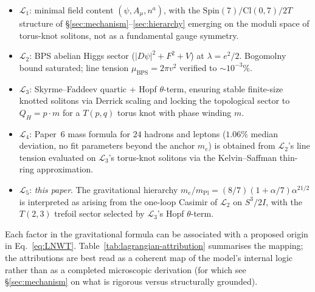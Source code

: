 \documentclass[11pt]{article}
\begin{document}
\begin{itemize}
  \item $\mathcal{L}_1$: minimal field content $(\psi, A_\mu,
        n^a)$, with the $\mathrm{Spin}(7)/\mathrm{Cl}(0,7)/2T$
        structure of \S\ref{sec:mechanism}--\ref{sec:hierarchy}
        emerging on the moduli space of torus-knot solitons,
        not as a fundamental gauge symmetry.
  \item $\mathcal{L}_2$: BPS abelian Higgs sector
        ($|D\psi|^2 + F^2 + V$) at $\lambda = e^2/2$.
        Bogomolny bound saturated; line tension
        $\mu_\text{BPS} = 2\pi v^2$ verified to $\sim 10^{-3}\%$.
  \item $\mathcal{L}_3$: Skyrme--Faddeev quartic + Hopf
        $\theta$-term, ensuring stable finite-size knotted
        solitons via Derrick scaling and locking the
        topological sector to $Q_H = p \cdot m$ for a
        $T(p, q)$ torus knot with phase winding $m$.
  \item $\mathcal{L}_4$: Paper~6 mass formula for $24$ hadrons
        and leptons ($1.06\%$ median deviation, no fit parameters
        beyond the anchor $m_e$) is obtained from $\mathcal{L}_2$'s
        line tension evaluated on $\mathcal{L}_3$'s torus-knot
        solitons via the Kelvin--Saffman thin-ring approximation.
  \item $\mathcal{L}_5$: \emph{this paper}.  The gravitational
        hierarchy
        $m_e/m_\text{Pl} = (8/7)(1 + \alpha/7)\alpha^{21/2}$
        is interpreted as arising from the one-loop Casimir of
        $\mathcal{L}_2$ on $S^3/2I$, with the $T(2,3)$ trefoil
        sector selected by $\mathcal{L}_3$'s Hopf $\theta$-term.
\end{itemize}

Each factor in the gravitational formula can be associated with a
proposed origin in Eq.~\ref{eq:LNWT}.
Table~\ref{tab:lagrangian-attribution} summarises the mapping;
the attributions are best read as a coherent map of the model's
internal logic rather than as a completed microscopic derivation
(for which see \S\ref{sec:mechanism} on what is rigorous versus
structurally grounded).
\end{document}
